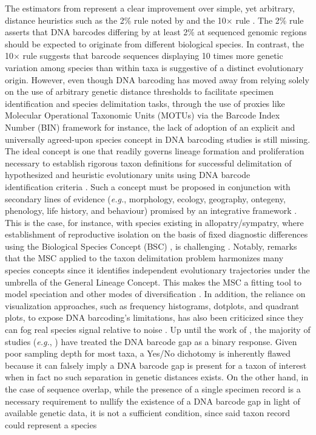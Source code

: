 \documentclass[12pt]{article}
\begin{document}
The estimators from \citet{phillips2024measure} represent a clear improvement over simple, yet arbitrary, distance heuristics such as the 2\% rule noted by \citet{hebert2003biological} and the 10$\times$ rule \citep{hebert2004identification}. The 2\% rule asserts that DNA barcodes differing by at least 2\% at sequenced genomic regions should be expected to originate from different biological species. In contrast, the 10$\times$ rule suggests that barcode sequences displaying 10 times more genetic variation among species than within taxa is suggestive of a distinct evolutionary origin. However, even though DNA barcoding has moved away from relying solely on the use of arbitrary genetic distance thresholds to facilitate specimen identification and species delimitation tasks, through the use of proxies like Molecular Operational Taxonomic Units (MOTUs) via the Barcode Index Number (BIN) framework \citep{ratnasingham2013bin} for instance, the lack of adoption of an explicit and universally agreed-upon species concept in DNA barcoding studies is still missing. The ideal concept is one that readily governs lineage formation and proliferation necessary to establish rigorous taxon definitions for successful delimitation of hypothesized and heuristic evolutionary units using DNA barcode \\ identification criteria \citep{dequeiroz2007species, pante2016species, rannala2015art, wells2022species}. Such a concept must be proposed in conjunction with secondary lines of evidence (\textit{e.g.}, morphology, ecology, geography, ontegeny, phenology, life history, and behaviour) promised by an integrative framework \citep{dayrat2005towards}. This is the case, for instance, with species existing in allopatry/sympatry, where establishment of reproductive isolation on the basis of fixed diagnostic differences using the Biological Species Concept (BSC) \citep{mayr1942systematics}, is challenging \citep{fujita2012coalescent}. Notably, \citet{fujita2012coalescent} remarks that the MSC applied to the taxon delimitation problem harmonizes many species concepts since it identifies independent evolutionary trajectories under the umbrella of the General Lineage Concept. This makes the MSC a fitting tool to model speciation and other modes of diversification \citep{collins2014known}. In addition, the reliance on visualization approaches, such as frequency  histograms, dotplots, and quadrant plots, to expose DNA barcoding's limitations, has also been criticized since they can fog real species signal relative to noise \citep{collins2013seven, phillips2022lack}. Up until the work of \cite{phillips2024measure}, the majority of studies (\textit{e.g.}, \citet{young2021macer}) have treated the DNA barcode gap as a binary response. Given poor sampling depth for most taxa, a Yes/No dichotomy is inherently flawed because it can falsely imply a DNA barcode gap is present for a taxon of interest when in fact no such separation in genetic distances exists. On the other hand, in the case of sequence overlap, while the presence of a single specimen record is a necessary requirement to nullify the existence of a DNA barcode gap in light of available genetic data, it is not a sufficient condition, since said taxon record could represent a species 
\end{document}

